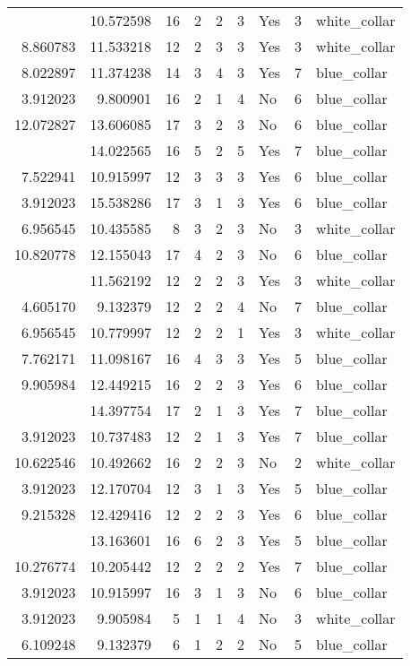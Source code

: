 \documentclass[
]{article}
\begin{document}
\begin{longtable}[t]{rrrrrllrl}
\addlinespace
7.625595 & 10.572598 & 16 & 2 & 2 & 3 & Yes & 3 & white\_collar\\
8.860783 & 11.533218 & 12 & 2 & 3 & 3 & Yes & 3 & white\_collar\\
8.022897 & 11.374238 & 14 & 3 & 4 & 3 & Yes & 7 & blue\_collar\\
3.912023 & 9.800901 & 16 & 2 & 1 & 4 & No & 6 & blue\_collar\\
12.072827 & 13.606085 & 17 & 3 & 2 & 3 & No & 6 & blue\_collar\\
\addlinespace
9.396820 & 14.022565 & 16 & 5 & 2 & 5 & Yes & 7 & blue\_collar\\
7.522941 & 10.915997 & 12 & 3 & 3 & 3 & Yes & 6 & blue\_collar\\
3.912023 & 15.538286 & 17 & 3 & 1 & 3 & Yes & 6 & blue\_collar\\
6.956545 & 10.435585 & 8 & 3 & 2 & 3 & No & 3 & white\_collar\\
10.820778 & 12.155043 & 17 & 4 & 2 & 3 & No & 6 & blue\_collar\\
\addlinespace
8.860783 & 11.562192 & 12 & 2 & 2 & 3 & Yes & 3 & white\_collar\\
4.605170 & 9.132379 & 12 & 2 & 2 & 4 & No & 7 & blue\_collar\\
6.956545 & 10.779997 & 12 & 2 & 2 & 1 & Yes & 3 & white\_collar\\
7.762171 & 11.098167 & 16 & 4 & 3 & 3 & Yes & 5 & blue\_collar\\
9.905984 & 12.449215 & 16 & 2 & 2 & 3 & Yes & 6 & blue\_collar\\
\addlinespace
3.912023 & 14.397754 & 17 & 2 & 1 & 3 & Yes & 7 & blue\_collar\\
3.912023 & 10.737483 & 12 & 2 & 1 & 3 & Yes & 7 & blue\_collar\\
10.622546 & 10.492662 & 16 & 2 & 2 & 3 & No & 2 & white\_collar\\
3.912023 & 12.170704 & 12 & 3 & 1 & 3 & Yes & 5 & blue\_collar\\
9.215328 & 12.429416 & 12 & 2 & 2 & 3 & Yes & 6 & blue\_collar\\
\addlinespace
11.695664 & 13.163601 & 16 & 6 & 2 & 3 & Yes & 5 & blue\_collar\\
10.276774 & 10.205442 & 12 & 2 & 2 & 2 & Yes & 7 & blue\_collar\\
3.912023 & 10.915997 & 16 & 3 & 1 & 3 & No & 6 & blue\_collar\\
3.912023 & 9.905984 & 5 & 1 & 1 & 4 & No & 3 & white\_collar\\
6.109248 & 9.132379 & 6 & 1 & 2 & 2 & No & 5 & blue\_collar\\

\end{longtable}
\end{document}
